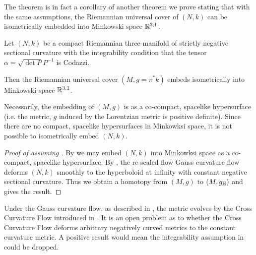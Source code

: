 \documentclass[a4paper, 12pt]{amsart}
\begin{document}
The theorem is in fact a corollary of another theorem we prove stating that with the same assumptions, the Riemannian universal cover of \((N, k)\) can be isometrically embedded into Minkowski space \(\mathbb{R}^{3,1}\).

\begin{thm}
\label{thm:intg_embed}
Let \((N, k)\) be a compact Riemannian three-manifold of strictly negative sectional curvature with the integrability condition that the tensor \(\alpha = \sqrt{\det P} P^{-1}\) is Codazzi.

Then the Riemannian universal cover \((M, g = \pi^{\ast} k)\) embeds isometrically into Minkowski space \(\mathbb{R}^{3,1}\).
\end{thm}

\begin{rem}
Necessarily, the embedding of \((M, g)\) is as a co-compact, spacelike hypersurface (i.e. the metric, \(g\) induced by the Lorentzian metric is positive definite). Since there are no compact, spacelike hypersurfaces in Minkowksi space, it is not possible to isometrically embed \((N, k)\).
\end{rem}

\begin{proof}
[Proof of  assuming ]

By  we may embed \((N, k)\) into Minkowksi space as a co-compact, spacelike hypersurface. By \cite[Theorem 1.1]{MR3344442}, the re-scaled flow Gauss curvature flow deforms \((N, k)\) smoothly to the hyperboloid at infinity with constant negative sectional curvature. Thus we obtain a homotopy from \((M, g)\) to \((M, g_{\mathbb{H}})\) and  gives the result.
\end{proof}

\begin{rem}
Under the Gauss curvature flow, as described in \cite[12. Application to the cross-curvature flow]{MR3344442}, the metric evolves by the Cross Curvature Flow introduced in \cite{MR2055396}. It is an open problem as to whether the Cross Curvature Flow deforms arbitrary negatively curved metrics to the constant curvature metric. A positive result would mean the integrability assumption in  could be dropped.
\end{rem}

\printbibliography
\end{document}
